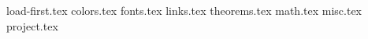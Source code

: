 
\makeatletter

{load-first.tex}
{colors.tex}
{fonts.tex}
{links.tex}
{theorems.tex}
{math.tex}
{misc.tex}
{project.tex}

\makeatother
